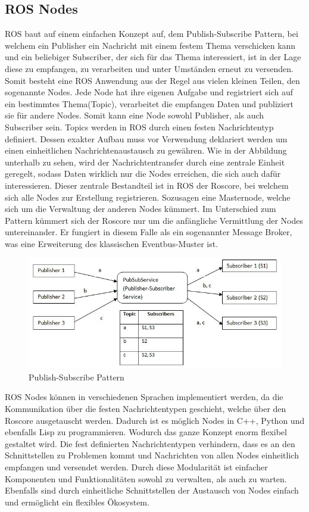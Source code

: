 \subsection{ROS Nodes}
ROS baut auf einem einfachen Konzept auf, dem Publish-Subscribe Pattern, bei welchem ein Publisher ein Nachricht mit einem festem Thema verschicken kann und ein beliebiger Subscriber, der sich für das Thema interessiert, ist in der Lage diese zu empfangen, zu verarbeiten und unter Umständen erneut zu versenden.  Somit besteht eine ROS Anwendung aus der Regel aus vielen kleinen Teilen, den sogenannte Nodes. Jede Node hat ihre eigenen Aufgabe und registriert sich auf ein bestimmtes Thema(Topic), verarbeitet die empfangen Daten und publiziert sie für andere Nodes. Somit kann eine Node sowohl Publisher, als auch Subscriber sein. Topics werden in ROS durch einen festen Nachrichtentyp definiert. Dessen exakter Aufbau muss vor Verwendung deklariert werden um einen einheitlichen Nachrichtenaustausch zu gewähren. Wie in der Abbildung unterhalb zu sehen, wird der Nachrichtentransfer durch eine zentrale Einheit geregelt, sodass Daten wirklich nur die Nodes erreichen, die sich auch dafür interessieren. Dieser zentrale Bestandteil ist in ROS der Roscore, bei welchem sich alle Nodes zur Erstellung registrieren. Sozusagen eine Masternode, welche sich um die Verwaltung der anderen Nodes kümmert. Im Unterschied zum Pattern kümmert sich der Roscore nur um die anfängliche Vermittlung der Nodes untereinander. Er fungiert in diesem Falle als ein sogenannter Message Broker\cite{messagebroker}, was eine Erweiterung des klassischen Eventbus-Muster ist\cite{eventbus}.
\begin{figure}[ht]
		\centering
	\includegraphics[scale=0.7]{Bilder/pubsub1.jpg}
	\caption[Publish-Subscribe Pattern]{Publish-Subscribe Pattern}

\end{figure}
\newline
ROS Nodes können in verschiedenen Sprachen implementiert werden, da die Kommunikation über die festen Nachrichtentypen geschieht, welche über den Roscore ausgetauscht werden. Dadurch ist es möglich Nodes in C++, Python und ebenfalls Lisp zu programmieren. Wodurch das ganze Konzept enorm flexibel gestaltet wird. Die fest definierten Nachrichtentypen verhindern, dass es an den Schnittstellen zu Problemen kommt und Nachrichten von allen Nodes einheitlich empfangen und versendet werden. \newline
Durch diese Modularität ist einfacher Komponenten und Funktionalitäten sowohl zu verwalten, als auch zu warten. Ebenfalls sind durch einheitliche Schnittstellen der Austausch von Nodes einfach und ermöglicht ein flexibles Ökosystem.

